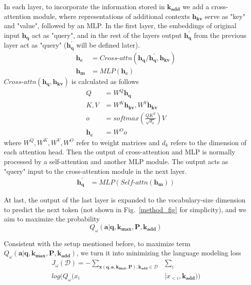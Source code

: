 In each layer, to incorporate the information stored in $\bm{k_{add}}$ we add a cross-attention module, where representations of additional contexts $\bm{h_{kv}}$ serve as "key" and "value", followed by an MLP. In the first layer, the embeddings of original input $\bm{h_{q}}$ act as "query", and in the rest of the layers output $\bm{h_{q}^{'}}$ from the previous layer act as "query" ($\bm{h_{q}^{'}}$ will be defined later).
\vspace{1pt}
\begin{align*}
\bm{h_{c}} &= Cross\text{-}attn(\bm{h_{q}}/\bm{h_{q}^{'}}, \bm{h_{kv}}) \\[1pt]
\bm{h_{m}} &= MLP(\bm{h_c}) 
\end{align*}
$Cross\text{-}attn(\bm{h_{q}}, \bm{h_{kv}})$ is calculated as follows
\begin{align*}
Q &= W^Q \bm{h_{q}} \\[4pt]
K, V &= W^K \bm{h_{kv}}, W^V \bm{h_{kv}} \\[4pt]
o &= softmax(\frac{QK^T}{\sqrt{d_k}})V \\[4pt]
\bm{h_{c}} &= W^O o
\end{align*}
where $W^Q, W^K, W^V, W^O$ refer to weight matrices and $d_k$ refers to the dimension of each attention head.
Then the output of cross-attention and MLP is normally processed by a self-attention and another MLP module. The output acts as "query" input to the cross-attention module in the next layer. 
\begin{align*}
\bm{h_{q}^{'}} &= MLP( Self\text{-}attn(\bm{h_{m}}) )
\end{align*}

At last, the output of the last layer is expanded to the vocabulary-size dimension to predict the next token (not shown in Fig.~\ref{method_fig} for simplicity), and we aim to maximize the probability
$$Q_{\omega}(\bm{a} | \bm{q}, \bm{k_{max}}, \bm{P}, \bm{k_{add}})$$

Consistent with the setup mentioned before, to maximize term  $Q_{\omega}(\bm{a} | \bm{q}, \bm{k_{max}}, \bm{P}, \bm{k_{add}})$, we turn it into minimizing the language modeling loss
\begin{equation}\label{our_objective}
\begin{split}
J_{\omega}(\mathcal{D}) = - \sum\limits_{ \bm{x}(\bm{q}, \bm{a}, \bm{k_{max}}, \bm{P}), \bm{k_{add}} \in \mathcal{D}} &\sum\limits_{i} \\[4pt]
log (Q_{\omega}(x_i&|x_{<i}, \bm{k_{add}}))
\end{split}
\end{equation}

